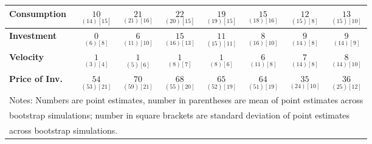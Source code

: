 \documentclass{article}
\begin{document}
\begin{tabular}{|l|c|@{}c|c|@{}c|c|@{}c|c|}
 \textbf{Consumption} & $\underset{( 14) [ 15]}{ 10}$ & $\underset{( 21) [ 16]}{ 21}$ & $\underset{( 20) [ 15]}{ 22}$ & $\underset{( 19) [ 15]}{ 19}$ & $\underset{( 18) [ 16]}{ 15}$ & $\underset{( 15) [  8]}{ 12}$ & $\underset{( 15) [ 10]}{ 13}$ \\ \hline 
 \textbf{Investment} & $\underset{(  6) [  8]}{  0}$ & $\underset{( 11) [ 10]}{  6}$ & $\underset{( 16) [ 13]}{ 15}$ & $\underset{( 15) [ 11]}{ 11}$ & $\underset{( 16) [ 10]}{  8}$ & $\underset{( 14) [  8]}{  9}$ & $\underset{( 14) [  9]}{  9}$ \\ \hline 
 \textbf{Velocity} & $\underset{(  3) [  4]}{  1}$ & $\underset{(  5) [  6]}{  1}$ & $\underset{(  8) [  7]}{  1}$ & $\underset{(  8) [  6]}{  1}$ & $\underset{( 11) [  8]}{  6}$ & $\underset{( 14) [  8]}{  7}$ & $\underset{( 14) [ 10]}{  8}$ \\ \hline 
 \textbf{Price of Inv.} & $\underset{( 53) [ 21]}{ 54}$ & $\underset{( 59) [ 21]}{ 70}$ & $\underset{( 55) [ 20]}{ 68}$ & $\underset{( 52) [ 19]}{ 65}$ & $\underset{( 51) [ 19]}{ 64}$ & $\underset{( 24) [ 10]}{ 35}$ & $\underset{( 25) [ 12]}{ 36}$ \\ \hline 
 \multicolumn{8}{|l|}{Notes: Numbers are point estimates, number in 
 parentheses are mean of point estimates across} \\ \hline 
 \multicolumn{8}{|l|}{bootstrap simulations; number in square brackets are 
 standard deviation of point estimates} \\ \hline 
 \multicolumn{8}{|l|}{across bootstrap simulations.} \\ \hline 
 \end{tabular} 
\end{document}
